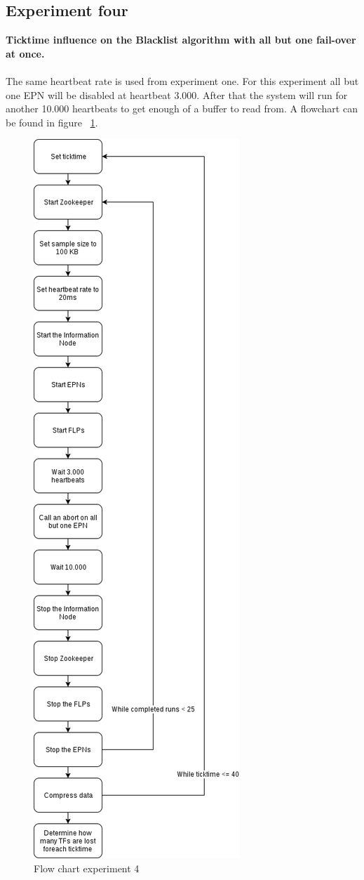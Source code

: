 \subsection{Experiment four}
\textbf{Ticktime influence on the Blacklist algorithm with all but one fail-over at once.}
\\~\\
The same heartbeat rate is used from experiment one. For this experiment all but one EPN will be disabled at heartbeat 3.000. After that the system will run for another 10.000 heartbeats to get enough of a buffer to read from. A flowchart can be found in figure ~\ref{fig:FlowChart4}.

\begin{figure}[htb]
	\centering
	\includegraphics[scale=0.3]{./graphics/ex4.png}
	\caption{Flow chart experiment 4}
	\label{fig:FlowChart4}
\end{figure}